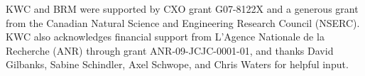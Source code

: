 \documentclass[iop]{emulateapj-rtx4}
\begin{document}
\acknowledgements

KWC and BRM were supported by CXO grant G07-8122X and a generous grant
from the Canadian Natural Science and Engineering Research Council
(NSERC). KWC also acknowledges financial support from L'Agence
Nationale de la Recherche (ANR) through grant ANR-09-JCJC-0001-01, and
thanks David Gilbanks, Sabine Schindler, Axel Schwope, and Chris
Waters for helpful input.





\clearpage






\end{document}
